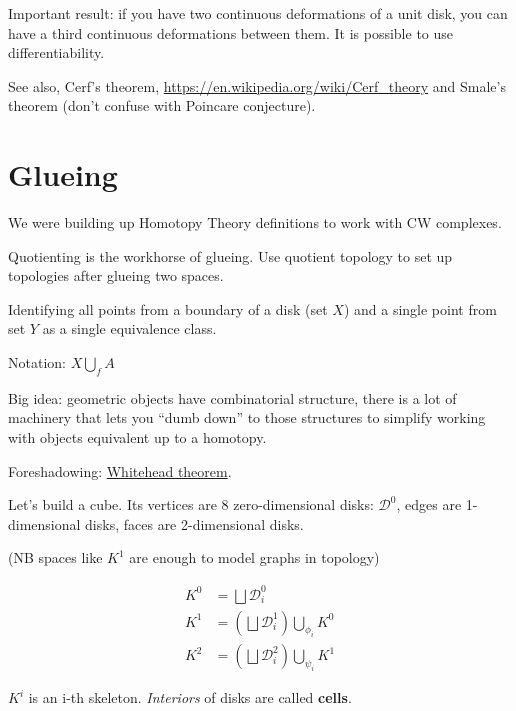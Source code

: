 \documentclass[10pt]{article}
\begin{document}
Important result: if you have two continuous deformations of a unit disk, you can have a third continuous deformations between them.
It is possible to use differentiability.

See also, Cerf's theorem, \url{https://en.wikipedia.org/wiki/Cerf_theory} and Smale's theorem (don't confuse with Poincare conjecture).

\section{Glueing}

We were building up Homotopy Theory definitions to work with CW complexes.


Quotienting is the workhorse of glueing. Use quotient topology to set up topologies after glueing two spaces.

\begin{example}
  Identifying all points from a boundary of a disk (set $X$) and a single point from set $Y$ as a single equivalence class.
\end{example}


Notation: $ X \bigcup_{f} A $

Big idea: geometric objects have combinatorial structure, there is a lot of machinery that lets you ``dumb down'' to those structures to simplify working with objects equivalent up to a homotopy.

Foreshadowing: \href{https://en.wikipedia.org/wiki/Whitehead_theorem}{Whitehead theorem}.

\begin{example}
Let's build a cube.
Its vertices are 8 zero-dimensional disks: $\mathcal{D}^0$, edges are 1-dimensional disks, faces are 2-dimensional disks.

(NB spaces like $K^1$ are enough to model graphs in topology)

\begin{align*}
  K^0 &= \bigsqcup \mathcal{D}_i^0\\
  K^1 &= \left(\bigsqcup \mathcal{D}_i^1\right) \bigcup_{\phi_i} K^0\\
  K^2 &= \left(\bigsqcup \mathcal{D}_i^2\right) \bigcup_{\psi_i} K^1
\end{align*}

$K^i$ is an i-th skeleton. \textit{Interiors} of disks are called {\bf cells}.

\end{example}
\end{document}
